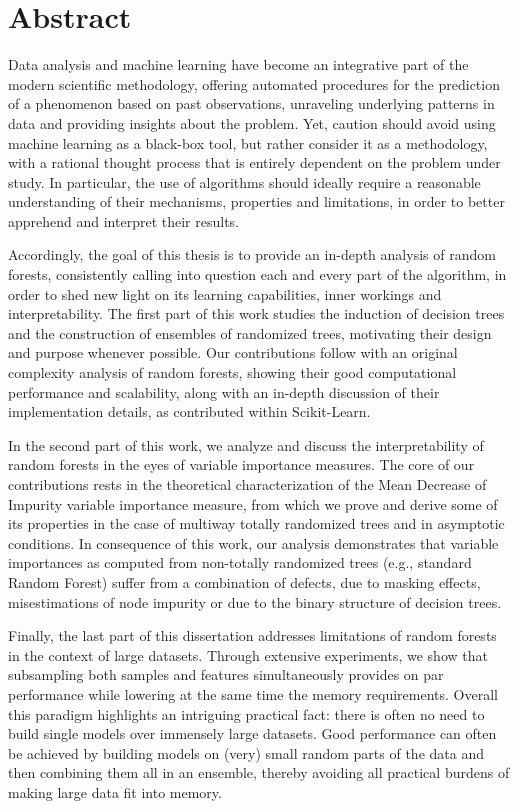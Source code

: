 
\chapter*{Abstract}

Data analysis and machine learning have become an integrative part of the
modern scientific methodology, offering automated procedures for the prediction
of a phenomenon based on past observations, unraveling underlying patterns in
data and providing insights about the problem. Yet, caution should
avoid using machine learning as a black-box tool, but rather consider it as a
methodology, with a rational thought process that is entirely dependent on the
problem under study. In particular, the use of algorithms
should ideally require a reasonable understanding of their
mechanisms, properties and limitations, in order to better apprehend and
interpret their results.

Accordingly, the goal of this thesis is to provide an in-depth
analysis of random forests, consistently calling into
question each and every part of the algorithm, in order to shed new light on
its learning capabilities, inner workings and interpretability. The first
part of this work studies the induction of decision trees and the construction of
ensembles of randomized trees, motivating their design and purpose whenever
possible. Our contributions follow with an original complexity
analysis of random forests, showing their good computational performance
and scalability, along with an in-depth discussion of their
implementation details, as contributed within Scikit-Learn.

In the second part of this work, we analyze and discuss the interpretability of
random forests in the eyes of variable importance measures. The core of our
contributions rests in the theoretical characterization of the Mean Decrease of
Impurity variable importance measure, from which we prove and derive some of
its properties in the case of multiway totally randomized trees and in
asymptotic conditions. In consequence of this work, our analysis  demonstrates
that variable importances as computed from non-totally randomized trees (e.g.,
standard Random Forest) suffer from a combination of defects, due to masking
effects, misestimations of node impurity or due to the binary structure of
decision trees.

Finally, the last part of this dissertation addresses limitations of random
forests in the context of large datasets. Through extensive experiments, we
show that subsampling both samples and features simultaneously provides on par
performance while lowering at the same time the memory requirements. Overall
this paradigm highlights an intriguing practical fact: there is often no need
to build single models over immensely large datasets. Good performance can
often be achieved by building models on (very) small random parts of the data
and then combining them all in an ensemble, thereby avoiding all practical
burdens of making large data fit into memory.
